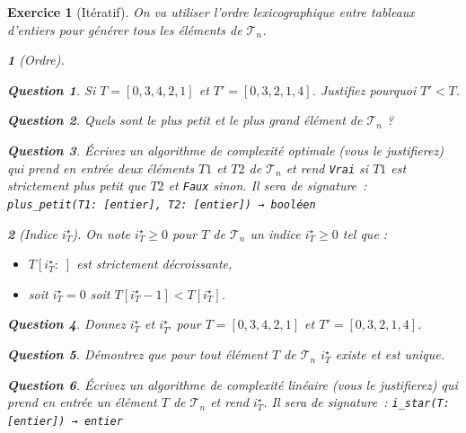 \documentclass{article}
\theoremstyle{exostyle}
\newtheorem{exo}{Exercice}
\theoremstyle{partiestyle}
\newtheorem{partie}{}[exo]
\theoremstyle{questionstyle}
\newtheorem{questionpartie}{Question}[partie]
\begin{document}
\begin{exo}[Itératif]
    On va utiliser l'ordre lexicographique entre tableaux d'entiers pour générer tous les éléments de $\mathcal{T}_n$. 
    \begin{partie}[Ordre]
        \begin{questionpartie}
            Si $T = [0, 3, 4, 2, 1]$ et $T' = [0, 3, 2, 1 ,4]$. Justifiez pourquoi $T' < T$.
        \end{questionpartie}
        \begin{questionpartie}
            Quels sont le plus petit et le plus grand élément de $\mathcal{T}_n$ ?
        \end{questionpartie}
        \begin{questionpartie}
            Écrivez un algorithme de complexité optimale (vous le justifierez) qui prend en entrée deux éléments $T1$ et $T2$ de $\mathcal{T}_n$ et rend \verb|Vrai| si $T1$ est strictement plus petit que $T2$ et \verb|Faux| sinon. Il sera de signature~:
              \verb|plus_petit(T1: [entier], T2: [entier]) → booléen| 
        \end{questionpartie}
    \end{partie}
    \begin{partie}[Indice $i^\star_{T}$]
        On note $i^\star_{T}\geq 0$ pour $T$ de $\mathcal{T}_n$ un indice $i^\star_{T}\geq 0$ tel que :
        \begin{itemize}
            \item $T[i^\star_{T}:\;]$ est strictement décroissante,
            \item soit $i^\star_{T}=0$ soit $T[i^\star_{T}-1] < T[i^\star_{T}]$.
        \end{itemize}
        \begin{questionpartie}
            Donnez $i^\star_{T}$ et $i^\star_{T'}$ pour $T = [0, 3, 4, 2, 1]$ et $T' = [0, 3, 2, 1 ,4]$.
        \end{questionpartie}
        \begin{questionpartie}
            Démontrez que pour tout élément $T$ de $\mathcal{T}_n$ $i^\star_{T}$ existe et est unique.
        \end{questionpartie}
        \begin{questionpartie}
            Écrivez un algorithme de complexité linéaire (vous le justifierez) qui prend en entrée un élément $T$ de $\mathcal{T}_n$ et rend $i^\star_{T}$. Il sera de signature~:
              \verb|i_star(T: [entier]) → entier| 
        \end{questionpartie}

\end{partie}
\end{exo}
\end{document}
